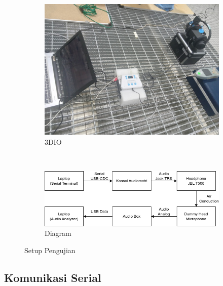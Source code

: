 \documentclass{article}
\begin{document}
	\begin{figure}[H]
		\centering
		\begin{subfigure}[]{.75\textwidth}
			\includegraphics[width=\textwidth]{images/3dio_setup}
			\caption{3DIO}
		\end{subfigure}
		\\
		\begin{subfigure}[]{.75\textwidth}
			\includegraphics[width=\textwidth]{images/diagram/setup_uji}
			\caption{Diagram}
		\end{subfigure}
		\caption{Setup Pengujian}
	\end{figure}

	\newpage
	\subsection{Komunikasi Serial}
\end{document}
